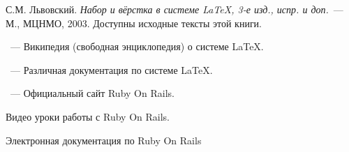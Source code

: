 \newpage

\begin{thebibliography}{}
С.М. Львовский.
{\em Набор и вёрстка в системе \LaTeX, 3-е изд., испр. и доп.}~---
М., МЦНМО, 2003. Доступны исходные тексты этой книги.

~---
Википедия (свободная энциклопедия) о системе \LaTeX.

~---
Различная документация по системе \LaTeX.

~---
Официальный сайт Ruby On Rails.

Видео уроки работы с Ruby On Rails.

Электронная документация по Ruby On Rails 

\end{thebibliography}

\endinput
